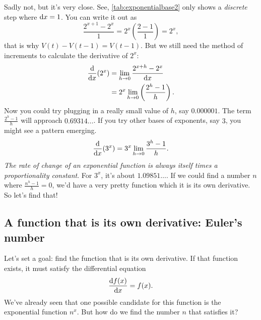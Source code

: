 Sadly not, but it's very close. See, \cref{tab:exponentialbase2} only shows a \emph{discrete} step where $\odif{x} = 1$. You can write it out as
\begin{equation}
    \frac{2^{x + 1} - 2^x}{1} = 2^x\left(\frac{2 - 1}{1}\right) = 2^x,
\end{equation}
that is why $V(t) - V(t - 1) = V(t - 1)$. But we still need the method of increments to calculate the derivative of $2^x$:
\begin{align*}
    \odv*{(2^x)}{x} &= \lim_{h \appr 0}\frac{2^{x + h} - 2^x}{\odif{x}} \\
    &= 2^x\lim_{h \appr 0}\left(\frac{2^h - 1}{h}\right).
\end{align*}
Now you could try plugging in a really small value of $h$, say $0.000001$. The term $\frac{2^h - 1}{h}$ will approach $0.69314\dots$. If you try other bases of exponents, say $3$, you might see a pattern emerging.
\begin{equation}
    \odv*{(3^x)}{x} = 3^x\lim_{h \appr 0}\frac{3^h - 1}{h}.
\end{equation}
\emph{The rate of change of an exponential function is always itself times a proportionality constant}. For $3^x$, it's about $1.09851\dots$. If we could find a number $n$ where $\frac{n^h - 1}{h} = 0$, we'd have a very pretty function which it is its own derivative. So let's find that!
 
\subsection{A function that is its own derivative: Euler's number}
\label{sec:function_equals_own_derivative}

Let's set a goal: find the function that is its own derivative. If that function exists, it must satisfy the differential equation
\begin{equation}
	\odv{f(x)}{x} = f(x). \label{eq:ex-differential-equation}
\end{equation}
We've already seen that one possible candidate for this function is the exponential function $n^x$. But how do we find the number $n$ that satisfies it?

